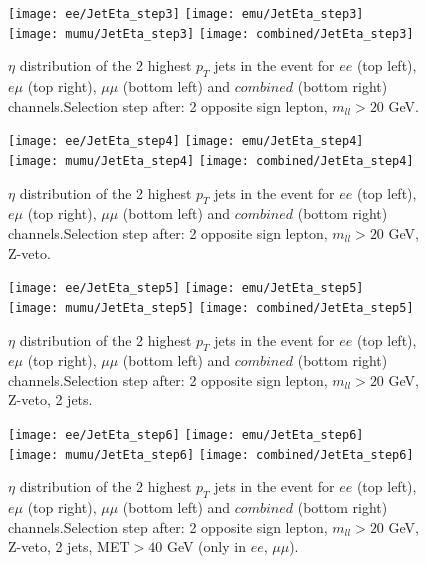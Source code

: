 \clearpage
\newpage

\begin{figure}
  \texttt{[image: ee/JetEta\_step3]}
  \texttt{[image: emu/JetEta\_step3]}\\
  \texttt{[image: mumu/JetEta\_step3]}
  \texttt{[image: combined/JetEta\_step3]}
\caption{$\eta$ distribution of the 2 highest $p_T$ jets in the event for $ee$ (top left), $e\mu$ (top right), $\mu\mu$ (bottom left) and $combined$ (bottom right) channels.\newline Selection step after: 2 opposite sign lepton, $m_{ll}>20$ GeV.}
\end{figure}

\clearpage
\newpage


\begin{figure}
  \texttt{[image: ee/JetEta\_step4]}
  \texttt{[image: emu/JetEta\_step4]}\\
  \texttt{[image: mumu/JetEta\_step4]}
  \texttt{[image: combined/JetEta\_step4]}
\caption{$\eta$ distribution of the 2 highest $p_T$ jets in the event for $ee$ (top left), $e\mu$ (top right), $\mu\mu$ (bottom left) and $combined$ (bottom right) channels.\newline Selection step after: 2 opposite sign lepton, $m_{ll}>20$ GeV, Z-veto.}
\end{figure}

\clearpage
\newpage


\begin{figure}
  \texttt{[image: ee/JetEta\_step5]}
  \texttt{[image: emu/JetEta\_step5]}\\
  \texttt{[image: mumu/JetEta\_step5]}
  \texttt{[image: combined/JetEta\_step5]}
\caption{$\eta$ distribution of the 2 highest $p_T$ jets in the event for $ee$ (top left), $e\mu$ (top right), $\mu\mu$ (bottom left) and $combined$ (bottom right) channels.\newline Selection step after: 2 opposite sign lepton, $m_{ll}>20$ GeV, Z-veto, 2 jets.}
\end{figure}

\clearpage
\newpage


\begin{figure}
  \texttt{[image: ee/JetEta\_step6]}
  \texttt{[image: emu/JetEta\_step6]}\\
  \texttt{[image: mumu/JetEta\_step6]}
  \texttt{[image: combined/JetEta\_step6]}
\caption{$\eta$ distribution of the 2 highest $p_T$ jets in the event for $ee$ (top left), $e\mu$ (top right), $\mu\mu$ (bottom left) and $combined$ (bottom right) channels.\newline Selection step after: 2 opposite sign lepton, $m_{ll}>20$ GeV, Z-veto, 2 jets, MET$>40$ GeV (only in $ee$, $\mu\mu$).}
\end{figure}

